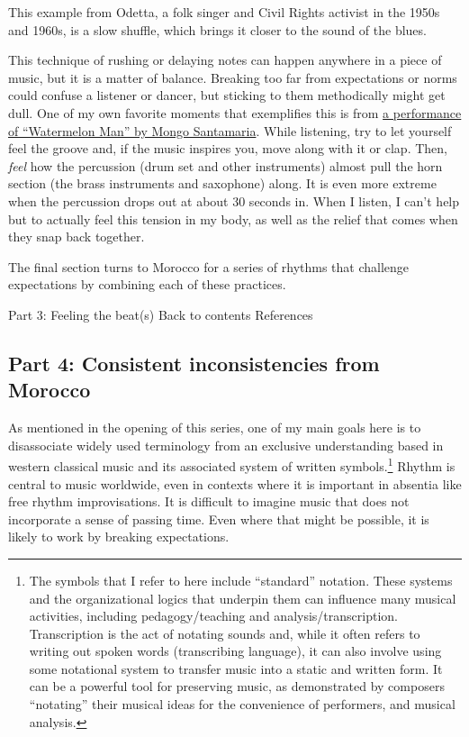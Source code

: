 \documentclass[twoside]{article}
\begin{document}
This example from Odetta, a folk singer and Civil Rights activist in the
1950s and 1960s, is a slow shuffle, which brings it closer to the sound
of the blues.

This technique of rushing or delaying notes can happen anywhere in a
piece of music, but it is a matter of balance. Breaking too far from
expectations or norms could confuse a listener or dancer, but sticking
to them methodically might get dull. One of my own favorite moments that
exemplifies this is from
\href{https://www.youtube.com/embed/zJuX-JJ8WF0}{a performance of
``Watermelon Man'' by Mongo Santamaria}. While listening, try to let
yourself feel the groove and, if the music inspires you, move along with
it or clap. Then, \emph{feel} how the percussion (drum set and other
instruments) almost pull the horn section (the brass instruments and
saxophone) along. It is even more extreme when the percussion drops out
at about 30 seconds in. When I listen, I can't help but to actually feel
this tension in my body, as well as the relief that comes when they snap
back together.

The final section turns to Morocco for a series of rhythms that
challenge expectations by combining each of these practices.

Part 3: Feeling the beat(s) Back to contents References

\hypertarget{part-4-consistent-inconsistencies-from-morocco}{%
\subsection{Part 4: Consistent inconsistencies from
Morocco}\label{part-4-consistent-inconsistencies-from-morocco}}

As mentioned in the opening of this series, one of my main goals here is
to disassociate widely used terminology from an exclusive understanding
based in western classical music and its associated system of written
symbols.\footnote{The symbols that I refer to here include ``standard''
  notation. These systems and the organizational logics that underpin
  them can influence many musical activities, including
  pedagogy/teaching and analysis/transcription. Transcription is the act
  of notating sounds and, while it often refers to writing out spoken
  words (transcribing language), it can also involve using some
  notational system to transfer music into a static and written form. It
  can be a powerful tool for preserving music, as demonstrated by
  composers ``notating'' their musical ideas for the convenience of
  performers, and musical analysis.} Rhythm is central to music
worldwide, even in contexts where it is important in absentia like free
rhythm improvisations. It is difficult to imagine music that does not
incorporate a sense of passing time. Even where that might be possible,
it is likely to work by breaking expectations.
\end{document}
